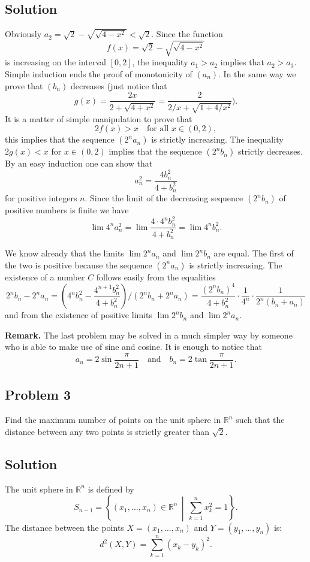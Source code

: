 \documentclass{article}
\begin{document}
\subsection*{Solution}
Obviously $a_2 = \sqrt{2} - \sqrt{\sqrt{4 - x^2}} < \sqrt{2}$. Since the function
\[
f(x) = \sqrt{2} - \sqrt{\sqrt{4 - x^2}}
\]
is increasing on the interval $[0,2]$, the inequality $a_1 > a_2$ implies that $a_2 > a_3$.
Simple induction ends the proof of monotonicity of $(a_n)$.
In the same way we prove that $(b_n)$ decreases (just notice that
\[
g(x) = \frac{2x}{2 + \sqrt{4 + x^2}} = \frac{2}{2/x + \sqrt{1 + 4/x^2}}).
\]
It is a matter of simple manipulation to prove that
\[
2f(x) > x \quad \text{for all } x \in (0,2),
\]
this implies that the sequence $(2^n a_n)$ is strictly increasing.
The inequality $2g(x) < x$ for $x \in (0,2)$ implies that the sequence $(2^n b_n)$ strictly decreases.
By an easy induction one can show that
\[
a_n^2 = \frac{4b_n^2}{4 + b_n^2}
\]
for positive integers $n$. Since the limit of the decreasing sequence $(2^n b_n)$
of positive numbers is finite we have
\[
\lim 4^n a_n^2 = \lim \frac{4 \cdot 4^n b_n^2}{4 + b_n^2} = \lim 4^n b_n^2.
\]

We know already that the limits $\lim 2^n a_n$ and $\lim 2^n b_n$ are equal.
The first of the two is positive because the sequence $(2^n a_n)$ is strictly increasing.
The existence of a number $C$ follows easily from the equalities
\[
2^n b_n - 2^n a_n = \left(4^n b_n^2 - \frac{4^{n+1} b_n^2}{4 + b_n^2} \right) / \left(2^n b_n + 2^n a_n\right) = \frac{(2^n b_n)^4}{4 + b_n^2} \cdot \frac{1}{4^n} \cdot \frac{1}{2^n(b_n + a_n)}
\]
and from the existence of positive limits $\lim 2^n b_n$ and $\lim 2^n a_n$.

\textbf{Remark.} The last problem may be solved in a much simpler way by someone
who is able to make use of sine and cosine. It is enough to notice that
\[
a_n = 2 \sin \frac{\pi}{2n+1} \quad \text{and} \quad b_n = 2 \tan \frac{\pi}{2n+1}.
\]

\subsection*{Problem 3}
Find the maximum number of points on the unit sphere in $\mathbb{R}^n$ such that
the distance between any two points is strictly greater than $\sqrt{2}$.

\subsection*{Solution}
The unit sphere in $\mathbb{R}^n$ is defined by
\[
S_{n-1} = \left\{ (x_1, \ldots, x_n) \in \mathbb{R}^n \,\middle|\, \sum_{k=1}^n x_k^2 = 1 \right\}.
\]
The distance between the points $X = (x_1, \ldots, x_n)$ and $Y = (y_1, \ldots, y_n)$ is:
\[
d^2(X,Y) = \sum_{k=1}^n (x_k - y_k)^2.
\]
\end{document}
